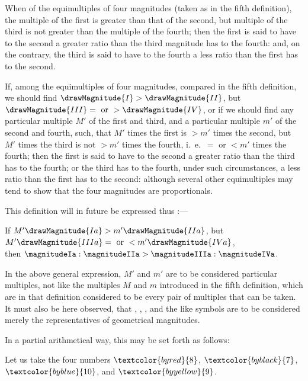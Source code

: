 \documentclass[booklanguage=english]{byrnebook}
\begin{document}
When of the equimultiples of four magnitudes (taken as in the fifth definition), the multiple of the first is greater than that of the second, but multiple of the third is not greater than the multiple of the fourth; then the first is said to have to the second a greater ratio than the third magnitude has to the fourth: and, on the contrary, the third is said to have to the fourth a less ratio than the first has to the second.

If, among the equimultiples of four magnitudes, compared in the fifth definition, we should find $\drawMagnitude{I} > \drawMagnitude{II}$, but $\drawMagnitude{III} = \mbox{ or } > \drawMagnitude{IV}$, or if we should find any particular multiple $M'$ of the first and third, and a particular multiple $m'$ of the second and fourth, such, that $M'$ times the first is $> m'$ times the second, but $M'$ times the third is not $> m'$ times the fourth, i.\ e.\ $= \mbox{ or } < m'$ times the fourth; then the first is said to have to the second a greater ratio than the third has to the fourth; or the third has to the fourth, under such circumstances, a less ratio than the first has to the second: although several other equimultiples may tend to show that the four magnitudes are proportionals.

This definition will in future be expressed thus :—

\begin{center}
If $M' \drawMagnitude{Ia} > m' \drawMagnitude{IIa}$, but $M' \drawMagnitude{IIIa} = \mbox{ or } < m' \drawMagnitude{IVa}$,\\
then $\magnitudeIa : \magnitudeIIa > \magnitudeIIIa : \magnitudeIVa$.
\end{center}

In the above general expression, $M'$ and $m'$ are to be considered particular multiples, not like the multiples $M$ and $m$ introduced in the fifth definition, which are in that definition considered to be every pair of multiples that can be taken. It must also be here observed, that \magnitudeIa, \magnitudeIIa, \magnitudeIIIa, and the like symbols are to be considered merely the representatives of geometrical magnitudes.

In a partial arithmetical way, this may be set forth as follows:

Let us take the four numbers $\textcolor{byred}{8}$, $\textcolor{byblack}{7}$, $\textcolor{byblue}{10}$, and $\textcolor{byyellow}{9}$.
\end{document}
